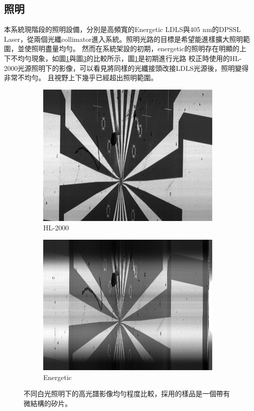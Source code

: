\documentclass[12pt]{article}
\begin{document}
\subsection{照明}
本系統現階段的照明設備，分別是高頻寬的Energetic LDLS與405 nm的DPSSL Laser，從兩個光纖collimator進入系統。照明光路的目標是希望能進樣擴大照明範圍，並使照明盡量均勻。
然而在系統架設的初期，energetic的照明存在明顯的上下不均勻現象，如圖\ref{fig: hl2000}與圖\ref{fig: energetic}的比較所示，圖\ref{fig: hl2000}是初期進行光路
校正時使用的HL-2000光源照明下的影像，可以看見將同樣的光纖接頭改接LDLS光源後，照明變得非常不均勻。
且視野上下幾乎已經超出照明範圍。
\begin{figure}
    \centering
    \begin{subfigure}[b]{0.45\textwidth}
        \includegraphics[width=\linewidth]{0831focusForOmFullScanHL2000Scaled.jpg}
        \caption{HL-2000}
        \label{fig: hl2000}
    \end{subfigure}
    \begin{subfigure}[b]{0.45\textwidth}
        \includegraphics[width=\linewidth]{0909Energetic.jpg}
        \caption{Energetic}
        \label{fig: energetic}
    \end{subfigure}
    \caption[不同白光照明下的高光譜影像均勻程度比較]{不同白光照明下的高光譜影像均勻程度比較，採用的樣品是一個帶有微結構的矽片。}
\end{figure}  
\end{document}
